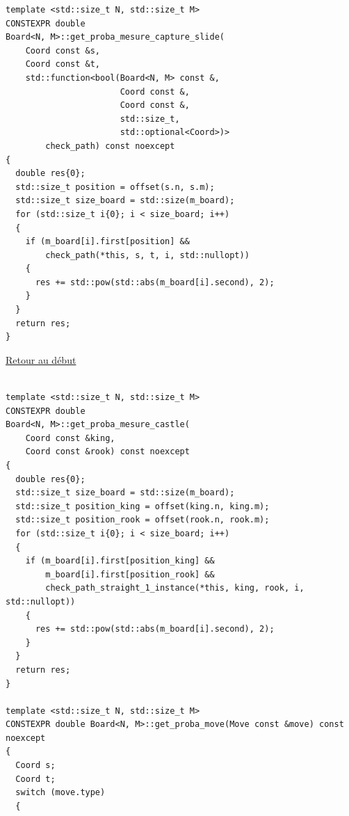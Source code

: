 {\begin{frame}[fragile]
\begin{verbatim}
template <std::size_t N, std::size_t M>
CONSTEXPR double
Board<N, M>::get_proba_mesure_capture_slide(
    Coord const &s,
    Coord const &t,
    std::function<bool(Board<N, M> const &,
                       Coord const &,
                       Coord const &,
                       std::size_t,
                       std::optional<Coord>)>
        check_path) const noexcept
{
  double res{0};
  std::size_t position = offset(s.n, s.m);
  std::size_t size_board = std::size(m_board);
  for (std::size_t i{0}; i < size_board; i++)
  {
    if (m_board[i].first[position] &&
        check_path(*this, s, t, i, std::nullopt))
    {
      res += std::pow(std::abs(m_board[i].second), 2);
    }
  }
  return res;
}
\end{verbatim}
\end{frame}

\begin{frame}[fragile]
\hyperlink{conclusion}{Retour au début}\newline
\begin{verbatim}

template <std::size_t N, std::size_t M>
CONSTEXPR double
Board<N, M>::get_proba_mesure_castle(
    Coord const &king,
    Coord const &rook) const noexcept
{
  double res{0};
  std::size_t size_board = std::size(m_board);
  std::size_t position_king = offset(king.n, king.m);
  std::size_t position_rook = offset(rook.n, rook.m);
  for (std::size_t i{0}; i < size_board; i++)
  {
    if (m_board[i].first[position_king] &&
        m_board[i].first[position_rook] &&
        check_path_straight_1_instance(*this, king, rook, i, std::nullopt))
    {
      res += std::pow(std::abs(m_board[i].second), 2);
    }
  }
  return res;
}

template <std::size_t N, std::size_t M>
CONSTEXPR double Board<N, M>::get_proba_move(Move const &move) const noexcept
{
  Coord s;
  Coord t;
  switch (move.type)
  {
\end{verbatim}
\end{frame}

}
